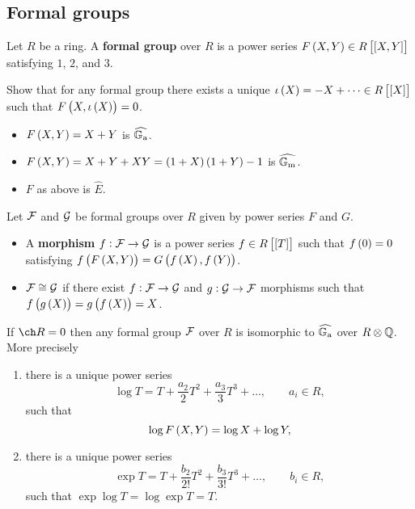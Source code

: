 \subsection{Formal groups}

\begin{definition*}
Let $ R $ be a ring. A \textbf{formal group} over $ R $ is a power series $ F\br{X, Y} \in R\sbr{\sbr{X, Y}} $ satisfying $ 1 $, $ 2 $, and $ 3 $.
\end{definition*}

\begin{exercise*}
Show that for any formal group there exists a unique $ \iota\br{X} = -X + \dots \in R\sbr{\sbr{X}} $ such that $ F\br{X, \iota\br{X}} = 0 $.
\end{exercise*}

\begin{example*}
\hfill
\begin{itemize}
\item $ F\br{X, Y} = X + Y $ is $ \widehat{\mathbb{G}_{\mathrm{a}}} $.
\item $ F\br{X, Y} = X + Y + XY = \br{1 + X}\br{1 + Y} - 1 $ is $ \widehat{\mathbb{G}_{\mathrm{m}}} $.
\item $ F $ as above is $ \widehat{E} $.
\end{itemize}
\end{example*}

\begin{definition*}
Let $ \mathcal{F} $ and $ \mathcal{G} $ be formal groups over $ R $ given by power series $ F $ and $ G $.
\begin{itemize}
\item A \textbf{morphism} $ f : \mathcal{F} \to \mathcal{G} $ is a power series $ f \in R\sbr{\sbr{T}} $ such that $ f\br{0} = 0 $ satisfying $ f\br{F\br{X, Y}} = G\br{f\br{X}, f\br{Y}} $.
\item $ \mathcal{F} \cong \mathcal{G} $ if there exist $ f : \mathcal{F} \to \mathcal{G} $ and $ g : \mathcal{G} \to \mathcal{F} $ morphisms such that $ f\br{g\br{X}} = g\br{f\br{X}} = X $.
\end{itemize}
\end{definition*}

\begin{theorem}
\label{thm:8.3}
If $ \ch R = 0 $ then any formal group $ \mathcal{F} $ over $ R $ is isomorphic to $ \widehat{\mathbb{G}_{\mathrm{a}}} $ over $ R \otimes \mathbb{Q} $. More precisely
\begin{enumerate}
\item there is a unique power series
$$ \log T = T + \dfrac{a_2}{2}T^2 + \dfrac{a_3}{3}T^3 + \dots, \qquad a_i \in R, $$
such that
\begin{equation}
\label{eq:11}
\log F\br{X, Y} = \log X + \log Y,
\end{equation}
\item there is a unique power series
$$ \exp T = T + \dfrac{b_2}{2!}T^2 + \dfrac{b_3}{3!}T^3 + \dots, \qquad b_i \in R, $$
such that $ \exp \log T = \log \exp T = T $.
\end{enumerate}
\end{theorem}

